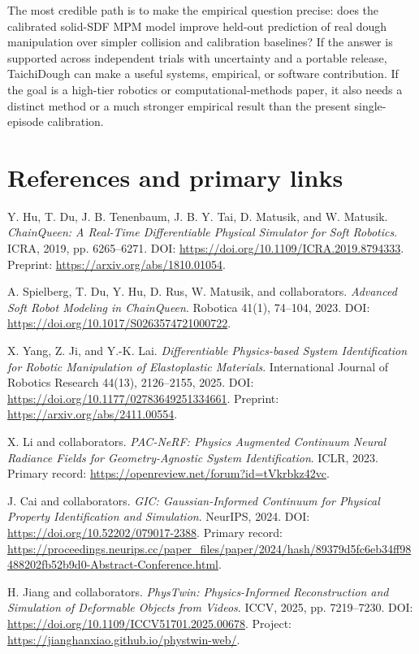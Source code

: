 \documentclass[11pt]{article}
\begin{document}
The most credible path is to make the empirical question precise: does the calibrated solid-SDF MPM model improve held-out prediction of real dough manipulation over simpler collision and calibration baselines? If the answer is supported across independent trials with uncertainty and a portable release, TaichiDough can make a useful systems, empirical, or software contribution. If the goal is a high-tier robotics or computational-methods paper, it also needs a distinct method or a much stronger empirical result than the present single-episode calibration.

\newpage
\section*{References and primary links}
\small
\begin{enumerate}[leftmargin=1.6em,label={[\arabic*]}]
\item Y. Hu, T. Du, J. B. Tenenbaum, J. B. Y. Tai, D. Matusik, and W. Matusik. \emph{ChainQueen: A Real-Time Differentiable Physical Simulator for Soft Robotics}. ICRA, 2019, pp. 6265--6271. DOI: \url{https://doi.org/10.1109/ICRA.2019.8794333}. Preprint: \url{https://arxiv.org/abs/1810.01054}.
\item A. Spielberg, T. Du, Y. Hu, D. Rus, W. Matusik, and collaborators. \emph{Advanced Soft Robot Modeling in ChainQueen}. Robotica 41(1), 74--104, 2023. DOI: \url{https://doi.org/10.1017/S0263574721000722}.
\item X. Yang, Z. Ji, and Y.-K. Lai. \emph{Differentiable Physics-based System Identification for Robotic Manipulation of Elastoplastic Materials}. International Journal of Robotics Research 44(13), 2126--2155, 2025. DOI: \url{https://doi.org/10.1177/02783649251334661}. Preprint: \url{https://arxiv.org/abs/2411.00554}.
\item X. Li and collaborators. \emph{PAC-NeRF: Physics Augmented Continuum Neural Radiance Fields for Geometry-Agnostic System Identification}. ICLR, 2023. Primary record: \url{https://openreview.net/forum?id=tVkrbkz42vc}.
\item J. Cai and collaborators. \emph{GIC: Gaussian-Informed Continuum for Physical Property Identification and Simulation}. NeurIPS, 2024. DOI: \url{https://doi.org/10.52202/079017-2388}. Primary record: \url{https://proceedings.neurips.cc/paper_files/paper/2024/hash/89379d5fc6eb34ff98488202fb52b9d0-Abstract-Conference.html}.
\item H. Jiang and collaborators. \emph{PhysTwin: Physics-Informed Reconstruction and Simulation of Deformable Objects from Videos}. ICCV, 2025, pp. 7219--7230. DOI: \url{https://doi.org/10.1109/ICCV51701.2025.00678}. Project: \url{https://jianghanxiao.github.io/phystwin-web/}.

\end{enumerate}
\end{document}
